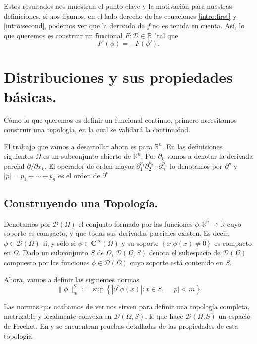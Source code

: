 \documentclass[letter,12pt]{article}
\newcommand\norm[1]{\lVert#1\rVert}
\begin{document}
Estos resultados nos muestran el punto clave y la motivación para nuestras definiciones,
si nos fijamos, en el lado derecho de las ecuaciones \ref{intro:first} y
\ref{intro:second}, podemos ver que la derivada de $ f $ no es tenida en cuenta.
Así, lo que queremos es construir un funcional $ F: \mathscr{D} \in \mathbb{R} $ ´tal 
que
\begin{equation}\label{intro:diff}
	F'(\phi) = -F(\phi').
\end{equation}

\section{Distribuciones y sus propiedades básicas.}
Cómo lo que queremos es definir un funcional continuo, primero necesitamos construir 
una topología, en la cual se validará la continuidad.

El trabajo que vamos a desarrollar ahora es para $ \mathbb{R}^n $. En las 
definiciones siguientes $ \Omega $ es un subconjunto abierto de 
$ \mathbb{R}^n $. Por $ \partial_{k} $ vamos a denotar la derivada parcial
$ \partial/\partial{x_k} $. El operador de orden mayor 
$ \partial^{p_1}_{1} \partial^{p_2}_{2} \cdots \partial^{p_n}_{n} $ lo denotamos
por $ \partial^p $ y $ |p| = p_1 + \cdots + p_n $ es el orden de $ \partial^p $

\subsection{Construyendo una Topología.}
Denotamos por $ \mathscr{D}(\Omega) $ el conjunto formado por las funciones 
$ \phi: \mathbb{R}^n \to \mathbb{R} $ cuyo soporte es compacto, y que todas sus
derivadas parciales existen. Es decir, $ \phi \in \mathscr{D}(\Omega) $ si, y sólo si
$ \phi \in \mathbf{C}^{\infty}(\Omega) $ y su soporte 
$ \left\{ x| \phi(x) \neq 0 \right\} $ es compacto en $ \Omega $.
Dado un subconjunto $ S $ de $ \Omega $, $ \mathscr{D}(\Omega, S) $ denota el 
subespacio de $ \mathscr{D}(\Omega) $ compuesto por las funciones 
$ \phi\in\mathscr{D}(\Omega) $ cuyo soporte está contenido en $ S $.

Ahora, vamos a definir las siguientes normas
\begin{equation}
 	\norm{\phi}^{S}_{m} := 
 	\sup{ \left\{ |\partial^p{\phi(x)}|: x\in S, \quad |p| < m  \right\} }
\end{equation}

Las normas que acabamos de ver nos sirven para definir una topología completa, 
metrizable y localmente convexa en $ \mathscr{D}(\Omega, S) $, lo que hace 
$ \mathscr{D}(\Omega, S) $ un espacio de Frechet. En \cite{Edwards} y \cite{Rudin}
se encuentran pruebas detalladas de las propiedades de esta topología.
\end{document}

